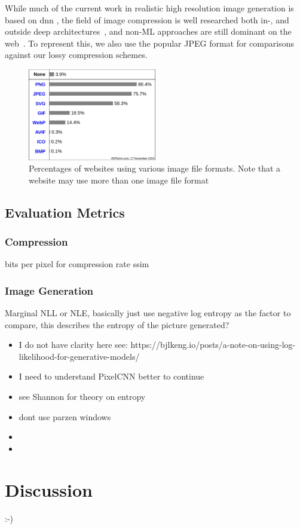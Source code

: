 \documentclass[10pt,a4paper,twoside]{article}
\begin{document}
While much of the current work in realistic high resolution image generation is based on \ac{dnn} \cite{addsources},
the field of image compression is well researched both in-, and outside deep architectures~\cite{compression},
and non-ML approaches are still dominant on the web~\cite{img_file_format}.
To represent this, we also use the popular JPEG format for comparisons against our lossy compression schemes.

\begin{figure}[h]
    \centering
    \includegraphics[width=0.5\textwidth]{images/formats}
    \caption{Percentages of websites using various image file formats. Note that a website may use more than one image file format~\cite{img_file_format}}
    \label{fig:file_formats}
\end{figure}

\subsection{Evaluation Metrics}\label{subsec:evaluation-metrics}
\subsubsection{Compression}
bits per pixel for compression rate
ssim
\subsubsection{Image Generation}
Marginal NLL or NLE, basically just use negative log entropy as the factor to compare, this describes the entropy of the picture generated?

\begin{itemize}
    \item I do not have clarity here see: https://bjlkeng.io/posts/a-note-on-using-log-likelihood-for-generative-models/
    \item I need to understand PixelCNN better to continue
    \item see Shannon for theory on entropy\cite{shannon}
    \item dont use parzen windows\cite{note_on_eval}
    \item
    \item
\end{itemize}

\section{Discussion}
:-)


\end{document}
